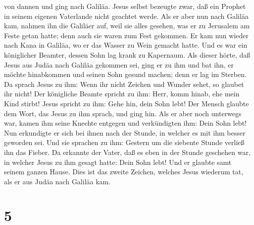 von dannen und ging nach Galiläa.  Jesus selbst bezeugte
zwar, daß ein Prophet in seinem eigenen Vaterlande nicht geachtet werde.
 Als er aber nun nach Galiläa kam, nahmen ihn die
Galiläer auf, weil sie alles gesehen, was er zu Jerusalem am Feste getan
hatte; denn auch sie waren zum Fest gekommen.  Er kam nun
wieder nach Kana in Galiläa, wo er das Wasser zu Wein gemacht hatte. Und
es war ein königlicher Beamter, dessen Sohn lag krank zu Kapernaum.
 Als dieser hörte, daß Jesus aus Judäa nach Galiläa
gekommen sei, ging er zu ihm und bat ihn, er möchte hinabkommen und
seinen Sohn gesund machen; denn er lag im Sterben.  Da
sprach Jesus zu ihm: Wenn ihr nicht Zeichen und Wunder sehet, so glaubet
ihr nicht!  Der königliche Beamte spricht zu ihm: Herr,
komm hinab, ehe mein Kind stirbt!  Jesus spricht zu ihm:
Gehe hin, dein Sohn lebt! Der Mensch glaubte dem Wort, das Jesus zu ihm
sprach, und ging hin.  Als er aber noch unterwegs war,
kamen ihm seine Knechte entgegen und verkündigten ihm: Dein Sohn lebt!
 Nun erkundigte er sich bei ihnen nach der Stunde, in
welcher es mit ihm besser geworden sei. Und sie sprachen zu ihm: Gestern
um die siebente Stunde verließ ihn das Fieber.  Da
erkannte der Vater, daß es eben in der Stunde geschehen war, in welcher
Jesus zu ihm gesagt hatte: Dein Sohn lebt! Und er glaubte samt seinem
ganzen Hause.  Dies ist das zweite Zeichen, welches Jesus
wiederum tat, als er aus Judäa nach Galiläa kam.

\hypertarget{section-4}{%
\section{5}\label{section-4}}

